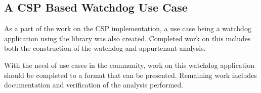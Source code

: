 \subsection{A CSP Based Watchdog Use Case} %
\label{sub:csp_based_watchdog}
As a part of the work on the CSP implementation, a use case being a watchdog application using the library was also created. Completed work on this includes both the construction of the watchdog and appurtenant analysis.

With the need of use cases in the community, work on this watchdog application should be completed to a format that can be presented. Remaining work includes documentation and verification of the analysis performed.




